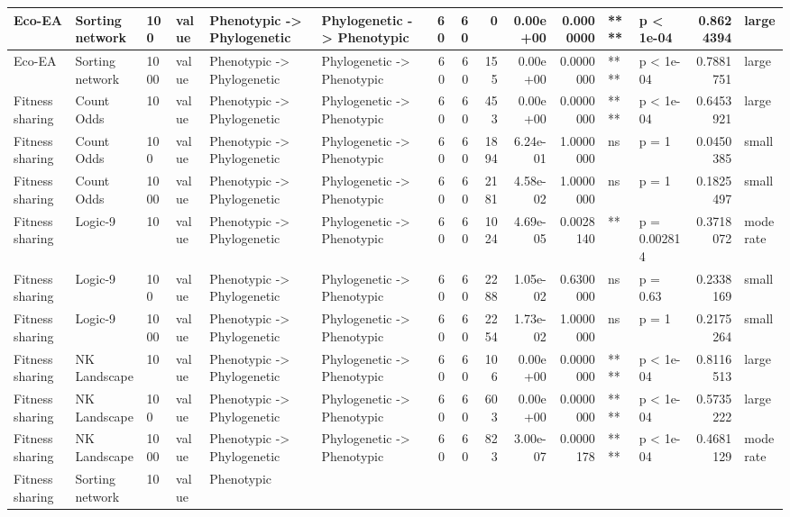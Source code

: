 \documentclass[]{book}
\begin{document}
\begin{table}
\begin{tabular}[t]{l|l|l|l|l|l|r|r|r|r|r|l|l|r|l}
\hline
Eco-EA & Sorting network & 100 & value & Phenotypic
    ->
Phylogenetic & Phylogenetic
    ->
Phenotypic & 60 & 60 & 0 & 0.00e+00 & 0.0000000 & **** & p < 1e-04 & 0.8624394 & large\\
\hline
Eco-EA & Sorting network & 1000 & value & Phenotypic
    ->
Phylogenetic & Phylogenetic
    ->
Phenotypic & 60 & 60 & 155 & 0.00e+00 & 0.0000000 & **** & p < 1e-04 & 0.7881751 & large\\
\hline
Fitness sharing & Count Odds & 10 & value & Phenotypic
    ->
Phylogenetic & Phylogenetic
    ->
Phenotypic & 60 & 60 & 453 & 0.00e+00 & 0.0000000 & **** & p < 1e-04 & 0.6453921 & large\\
\hline
Fitness sharing & Count Odds & 100 & value & Phenotypic
    ->
Phylogenetic & Phylogenetic
    ->
Phenotypic & 60 & 60 & 1894 & 6.24e-01 & 1.0000000 & ns & p = 1 & 0.0450385 & small\\
\hline
Fitness sharing & Count Odds & 1000 & value & Phenotypic
    ->
Phylogenetic & Phylogenetic
    ->
Phenotypic & 60 & 60 & 2181 & 4.58e-02 & 1.0000000 & ns & p = 1 & 0.1825497 & small\\
\hline
Fitness sharing & Logic-9 & 10 & value & Phenotypic
    ->
Phylogenetic & Phylogenetic
    ->
Phenotypic & 60 & 60 & 1024 & 4.69e-05 & 0.0028140 & ** & p = 0.002814 & 0.3718072 & moderate\\
\hline
Fitness sharing & Logic-9 & 100 & value & Phenotypic
    ->
Phylogenetic & Phylogenetic
    ->
Phenotypic & 60 & 60 & 2288 & 1.05e-02 & 0.6300000 & ns & p = 0.63 & 0.2338169 & small\\
\hline
Fitness sharing & Logic-9 & 1000 & value & Phenotypic
    ->
Phylogenetic & Phylogenetic
    ->
Phenotypic & 60 & 60 & 2254 & 1.73e-02 & 1.0000000 & ns & p = 1 & 0.2175264 & small\\
\hline
Fitness sharing & NK Landscape & 10 & value & Phenotypic
    ->
Phylogenetic & Phylogenetic
    ->
Phenotypic & 60 & 60 & 106 & 0.00e+00 & 0.0000000 & **** & p < 1e-04 & 0.8116513 & large\\
\hline
Fitness sharing & NK Landscape & 100 & value & Phenotypic
    ->
Phylogenetic & Phylogenetic
    ->
Phenotypic & 60 & 60 & 603 & 0.00e+00 & 0.0000000 & **** & p < 1e-04 & 0.5735222 & large\\
\hline
Fitness sharing & NK Landscape & 1000 & value & Phenotypic
    ->
Phylogenetic & Phylogenetic
    ->
Phenotypic & 60 & 60 & 823 & 3.00e-07 & 0.0000178 & **** & p < 1e-04 & 0.4681129 & moderate\\
\hline
Fitness sharing & Sorting network & 10 & value & Phenotypic

\end{tabular}
\end{table}
\end{document}
